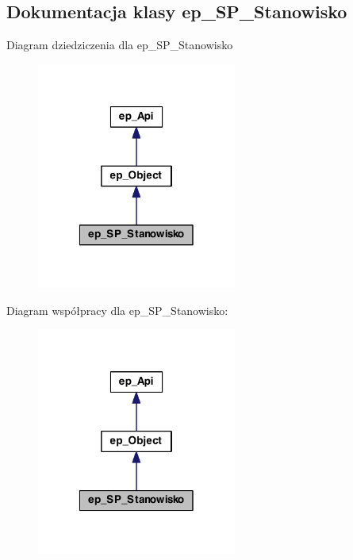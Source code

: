 \hypertarget{classep___s_p___stanowisko}{\subsection{Dokumentacja klasy ep\-\_\-\-S\-P\-\_\-\-Stanowisko}
\label{classep___s_p___stanowisko}
}


Diagram dziedziczenia dla ep\-\_\-\-S\-P\-\_\-\-Stanowisko\nopagebreak
\begin{figure}[H]
\begin{center}
\leavevmode
\includegraphics[width=186pt]{classep___s_p___stanowisko__inherit__graph}
\end{center}
\end{figure}


Diagram współpracy dla ep\-\_\-\-S\-P\-\_\-\-Stanowisko\-:\nopagebreak
\begin{figure}[H]
\begin{center}
\leavevmode
\includegraphics[width=186pt]{classep___s_p___stanowisko__coll__graph}
\end{center}
\end{figure}
